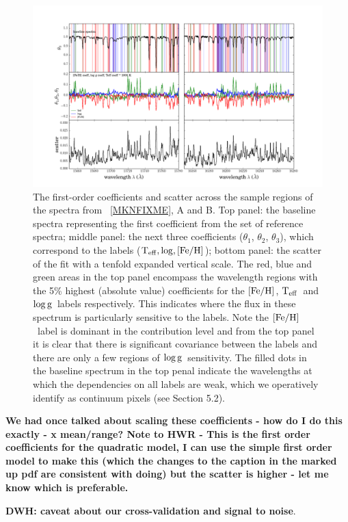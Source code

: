 \documentclass[12pt, preprint]{aastex}
\newcommand{\teff}{\mbox{$\rm T_{eff}$}}
\newcommand{\feh}{\mbox{$\rm [Fe/H]$}}
\newcommand{\logg}{\mbox{$\rm \log g$}}
\begin{document}
\begin{figure}[h!]
\centering
    \includegraphics[width=\hsize]{./plots/R1_continuum4.png}
  \caption{The first-order coefficients and scatter across the sample regions of the spectra from \figurename~\ref{MKNFIXME}, A and B. Top panel: the baseline spectra representing the first coefficient from the set of reference spectra; middle panel: the next three coefficients ($\theta_1$, $\theta_2$, $\theta_3$),  which correspond to the labels ($\teff, \log, \feh$); bottom panel: the scatter of the fit with a tenfold expanded vertical scale.  The red, blue and green areas in the top panel encompass the wavelength regions with the 5\% highest (absolute value) coefficients for the \feh, \teff\ and \logg\ labels respectively. This indicates where the flux in these spectrum is particularly sensitive to the labels.  Note the \feh\ label is dominant in the contribution level and from the top panel it is clear that there is significant covariance between the labels and there are only a few regions of \logg\ sensitivity. The filled dots in the baseline spectrum in the top penal indicate the wavelengths at which the dependencies on all labels are weak, which we operatively identify as continuum pixels (see Section 5.2).}
\label{fig:coeffs}
\end{figure}
\textbf{We had once talked about scaling these coefficients - how do I do this exactly - x mean/range? Note to HWR - This is the first order coefficients for the quadratic model, I can use the simple first order model to make this (which the changes to the caption in the marked up pdf are consistent with doing) but the scatter is higher - let me know which is preferable.}

\textbf{DWH: caveat about our cross-validation and signal to noise}. 
\end{document}
